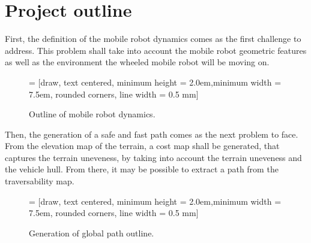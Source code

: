 \section{Project outline}
\label{section:projectOutline}

First, the definition of the mobile robot dynamics comes as the first challenge to address. This problem shall take into account the mobile robot geometric features as well as the environment the wheeled mobile robot will be moving on.

\begin{figure}[!h]
	\centering
	 = [draw, text centered, minimum height = 2.0em,minimum width = 7.5em, rounded corners, line width = 0.5 mm]
	\caption{Outline of mobile robot dynamics.}
    \label{fig:outlinerobotdynamics}
\end{figure}

Then, the generation of a safe and fast path comes as the next problem to face. From the elevation map of the terrain, a cost map shall be generated, that captures the terrain uneveness, by taking into account the terrain uneveness and the vehicle hull. From there, it may be possible to extract a path from the traversability map.

\begin{figure}[!h]
	\centering
	 = [draw, text centered, minimum height = 2.0em,minimum width = 7.5em, rounded corners, line width = 0.5 mm]
	
	\caption{Generation of global path outline.}
    \label{fig:outlineglobalpathgen}
\end{figure}

